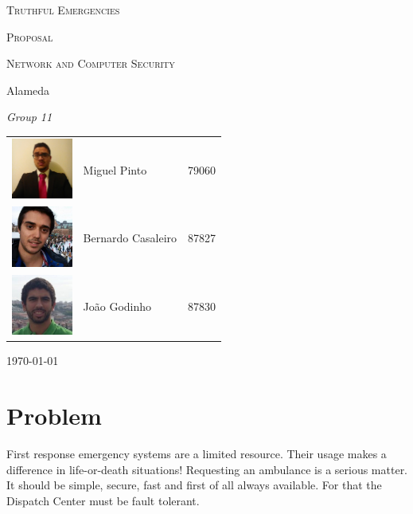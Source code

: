 \documentclass[a4paper,titlepage,11pt]{article}
\begin{document}
\begin{titlepage}
  \begin{center}
    {\scshape \huge Truthful Emergencies \par}
    \vspace{1cm}

    {\scshape \LARGE Proposal \par}
    \vspace{1.5cm}

    {\scshape \Large Network and Computer Security \par}
    \vspace{0.5cm}

    {\Large Alameda \par}
    \vfill

    {\itshape \Large Group 11 \par}
    \vfill

    \begin{tabular}{l l l}
      \includegraphics[width=20mm, height=20mm]{img/miguel.jpg} & Miguel Pinto & 79060\\
      \includegraphics[width=20mm, height=20mm]{img/bernardo.jpeg} & Bernardo Casaleiro & 87827\\
      \includegraphics[width=20mm, height=20mm]{img/joao.jpeg} & João Godinho & 87830\\
    \end{tabular}
    \vfill

    {\large \today\par}
  \end{center}
\end{titlepage}

\section{Problem}
First response emergency systems are a limited resource. Their usage makes a difference in life-or-death situations!
Requesting an ambulance is a serious matter.
It should be simple, secure, fast and first of all always available.
For that the Dispatch Center must be fault tolerant.
\end{document}
